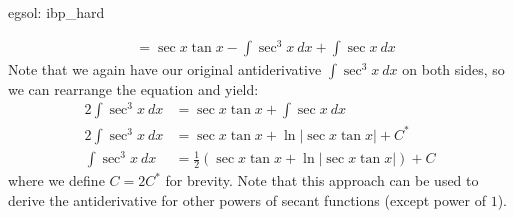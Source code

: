 \begin{egsol}[]{egsol: ibp_hard}
\begin{enumerate}[a)]
\begin{align*}
            &= \sec x \tan x - \int \sec^3 x~dx + \int \sec x~dx
        \end{align*}
        Note that we again have our original antiderivative $\int \sec^3 x~dx$ on both sides, so we can rearrange the equation and yield:
        \begin{align*}
            2\int \sec^3 x~dx &= \sec x \tan x + \int \sec x~dx\\
            2\int \sec^3 x~dx &= \sec x \tan x + \ln |\sec x \tan x| + C^*\\
            \int \sec^3 x~dx &= \frac{1}{2}(\sec x \tan x + \ln |\sec x \tan x|) + C
        \end{align*}
        where we define $C = 2C^*$ for brevity.  Note that this approach can be used to derive the antiderivative for other powers of secant functions (except power of $1$).
    \end{enumerate}
\end{egsol}